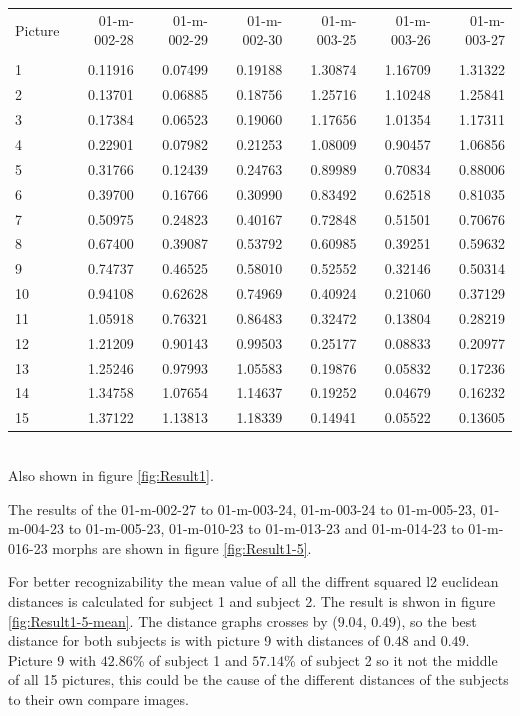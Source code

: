 \begin{tabular}{lrrrrrr}
	Picture & 01-m-002-28 & 01-m-002-29 & 01-m-002-30 & 01-m-003-25 & 01-m-003-26 & 01-m-003-27 \\
	 & & & & & & \\
	1 & 0.11916 & 0.07499 & 0.19188 & 1.30874 & 1.16709 & 1.31322\\
	2 & 0.13701 & 0.06885 & 0.18756 & 1.25716 & 1.10248 & 1.25841\\ 
	3 & 0.17384 & 0.06523 & 0.19060 & 1.17656 & 1.01354 & 1.17311\\ 
	4 & 0.22901 & 0.07982 & 0.21253 & 1.08009 & 0.90457 & 1.06856\\ 
	5 & 0.31766 & 0.12439 & 0.24763 & 0.89989 & 0.70834 & 0.88006\\ 
	6 & 0.39700 & 0.16766 & 0.30990 & 0.83492 & 0.62518 & 0.81035\\ 
	7 & 0.50975 & 0.24823 & 0.40167 & 0.72848 & 0.51501 & 0.70676\\ 
	8 & 0.67400 & 0.39087 & 0.53792 & 0.60985 & 0.39251 & 0.59632\\ 
	9 & 0.74737 & 0.46525 & 0.58010 & 0.52552 & 0.32146 & 0.50314\\ 
	10 & 0.94108 & 0.62628 & 0.74969 & 0.40924 & 0.21060 & 0.37129\\ 
	11 & 1.05918 & 0.76321 & 0.86483 & 0.32472 & 0.13804 & 0.28219\\ 
	12 & 1.21209 & 0.90143 & 0.99503 & 0.25177 & 0.08833 & 0.20977\\ 
	13 & 1.25246 & 0.97993 & 1.05583 & 0.19876 & 0.05832 & 0.17236\\ 
	14 & 1.34758 & 1.07654 & 1.14637 & 0.19252 & 0.04679 & 0.16232\\ 
	15 & 1.37122 & 1.13813 & 1.18339 & 0.14941 & 0.05522 & 0.13605\\ 
\end{tabular}\\

Also shown in figure \ref{fig:Result1}.

The results of the 01-m-002-27 to 01-m-003-24, 01-m-003-24 to 01-m-005-23, 01-m-004-23 to 01-m-005-23, 01-m-010-23 to 01-m-013-23 and 01-m-014-23 to 01-m-016-23 morphs are shown in figure \ref{fig:Result1-5}.

For better recognizability the mean value of all the diffrent squared l2 euclidean distances is calculated for subject 1 and subject 2. The result is shwon in figure \ref{fig:Result1-5-mean}. The distance graphs crosses by ($9.04$, $0.49$), so the best distance for both subjects is with picture 9 with distances of $0.48$ and $0.49$. Picture 9 with $42.86$\% of subject 1 and $57.14$\% of subject 2 so it  not the middle of all 15 pictures, this could be the cause of the different distances of the subjects to their own compare images.

